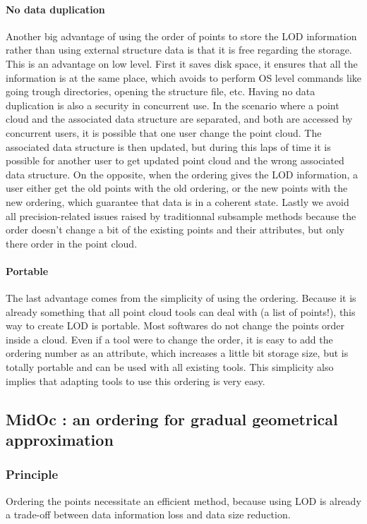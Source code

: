 			\paragraph{No data duplication}
				Another big advantage of using the order of points to store the LOD information rather than using external structure data is that it is free regarding the storage.
				This is an advantage on low level. First it saves disk space, it ensures that all the information is at the same place, which avoids to perform OS level commands like going trough directories, opening the structure file, etc.
				Having no data duplication is also a security in concurrent use.
				In the scenario where a point cloud and the associated data structure are separated, and both are accessed by concurrent users, it is possible that one user change the point cloud. The associated data structure is then updated, but during this laps of time it is possible for another user to get updated point cloud and the wrong associated data structure.  
				On the opposite, when the ordering gives the LOD information, a user either get the old points with the old ordering, or the new points with the new ordering, which guarantee that data is in a coherent state.
				Lastly we avoid all precision-related issues raised by traditionnal subsample methods because the order doesn't change a bit of the existing points and their attributes, but only there order in the point cloud.
			\paragraph{Portable}
				The last advantage comes from the simplicity of using the ordering. 
				Because it is already something that all point cloud tools can deal with (a list of points!), this way to create LOD is portable. Most softwares do not change the points order inside a cloud.
				Even if a tool were to change the order, it is easy to add the ordering number as an attribute, which increases a little bit storage size, but is totally portable and can be used with all existing tools.
				This simplicity also implies that adapting tools to use this ordering is very easy.
	
	\subsection{ MidOc : an ordering for gradual geometrical approximation}
		\label{method:midoc}
		\subsubsection{Principle}
			Ordering the points necessitate an efficient method, because using LOD is already a trade-off between data information loss and data size reduction.
			
